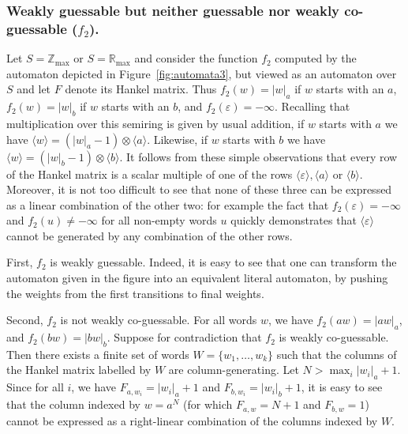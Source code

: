 \documentclass{lmcs}
\numberwithin{theorem}{section}
\begin{document}
	\subsubsection*{\textbf{Weakly guessable but neither guessable nor weakly co-guessable ($f_2$)}.}
\label{app:examplef2}
	Let $S=\mathbb{Z}_{\max}$ or $S=\mathbb{R}_{\max}$ and consider the function $f_2$  computed by the automaton depicted in Figure~\ref{fig:automata3}, but viewed as an automaton over $S$ and let $F$ denote its Hankel matrix. Thus $f_2(w) = |w|_a$ if $w$ starts with an $a$, $f_2(w) = |w|_b$ if $w$ starts with an $b$, and $f_2(\varepsilon) = -\infty$.  Recalling that multiplication over this semiring 
    is given by usual addition, if $w$ starts with $a$ we have $\langle w \rangle = (|w|_a - 1) \otimes \langle a \rangle$. Likewise, if $w$ starts with $b$ we have $\langle w \rangle = (|w|_b - 1) \otimes \langle b \rangle$. It follows from these simple observations that every row of the Hankel matrix is a scalar multiple of one of the rows $\langle \varepsilon \rangle, \langle a \rangle$ or $\langle b \rangle$. Moreover, it is not too difficult to see that none of these three can be expressed as a linear combination of the other two: for example the fact that $f_2(\varepsilon)= -\infty$ and $f_2(u) \neq -\infty$ for all non-empty words $u$ quickly demonstrates that $\langle \varepsilon \rangle$ cannot be generated by any combination of the other rows.
	
	First, $f_2$ is weakly guessable. Indeed, it is easy to see that one can transform the automaton given in the figure into an equivalent literal automaton, by pushing the weights from the first transitions to final weights. 
	
	Second, $f_2$ is not weakly co-guessable. For all words $w$, we have $f_2(aw) = |aw|_a$, and $f_2(bw) = |bw|_b$. Suppose for contradiction that $f_2$ is weakly co-guessable. Then there exists a finite set of words $W=\{w_1, \ldots ,w_k\}$ such that the columns of the Hankel matrix labelled by $W$ are column-generating. Let $N> \max_i|w_i|_a + 1$. Since for all $i$, we have $F_{a, w_i} = |w_i|_a + 1$ and $F_{b, w_i} = |w_i|_b+1$, it is easy to see that the column indexed by $w = a^N$ (for which $F_{a, w} = N+1$ and $F_{b, w} = 1$) cannot be expressed as a right-linear combination of the columns indexed by $W$.
	
\end{document}
